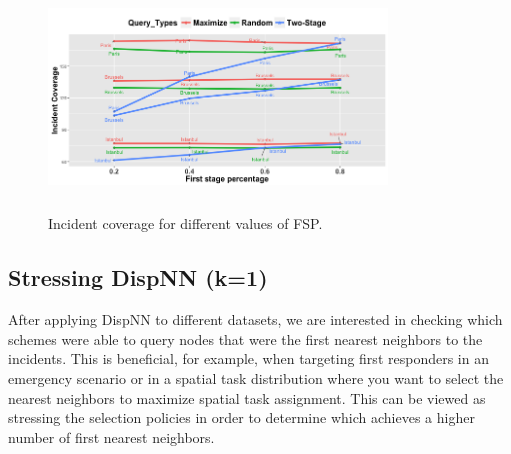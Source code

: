 \documentclass{acm_proc_article-sp}
\begin{document}
\begin{figure}[!h]
\centering
\includegraphics[width=9cm ,height=6cm]{figuresPng/citiesInc.png}
\caption{Incident coverage for different values of FSP. }
\label{fig: hollaIncCoverage}
\end{figure}
\subsection{Stressing DispNN (k=1)}
After applying DispNN to different datasets, we are interested in checking which schemes were able to query nodes that were the first nearest neighbors to the incidents. This is beneficial, for example, when targeting first responders in an emergency scenario or in a spatial task distribution where you want to select the nearest neighbors to maximize spatial task assignment. This can be viewed as stressing the selection policies in order to determine which achieves a higher number of first nearest neighbors.\par
\end{document}
